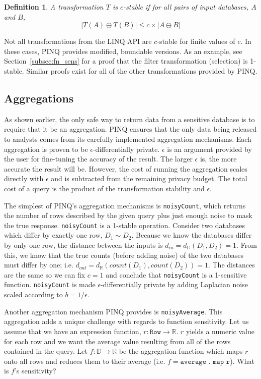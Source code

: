 \documentclass[12pt]{report}
\newtheorem{defn}{Definition}[section]
\begin{document}
\begin{defn}
A transformation $T$ is $c$-stable if for all pairs of input databases, $A$ and $B$,
$$
  |T(A)\ominus T(B)| \le c \times | A \ominus B |
$$
\end{defn}

Not all transformations from the LINQ API are $c$-stable for finite values of $c$.
In these cases, PINQ provides modified, boundable versions.
As an example, see Section~\ref{subsec:fn_sens} for a proof that the filter transformation (selection) is 1-stable.
Similar proofs exist for all of the other transformations provided by PINQ\cite{conf/sigmod/McSherry09}.

\subsection{Aggregations}

As shown earlier, the only safe way to return data from a sensitive database is to require that it be an aggregation.
PINQ ensures that the only data being released to analysts comes from its carefully implemented aggregation mechanisms.
Each aggregation is proven to be $\epsilon$-differentially private.
$\epsilon$ is an argument provided by the user for fine-tuning the accuracy of the result.
The larger $\epsilon$ is, the more accurate the result will be.
However, the cost of running the aggregation scales directly with $\epsilon$ and is subtracted from the remaining privacy budget.
The total cost of a query is the product of the transformation stability and $\epsilon$.

The simplest of PINQ's aggregation mechanisms is \texttt{noisyCount}, which returns the number of rows described by the given query plus just enough noise to mask the true response.
\texttt{noisyCount} is a 1-stable operation.
Consider two databases which differ by exactly one row, $D_1 \sim D_2$.
Because we know the databases differ by only one row, the distance between the inputs is $d_{in} = d_{\mathbb D}(D_1,D_2)=1$.
From this, we know that the true counts (before adding noise) of the two databases must differ by one; i.e. $d_{out} = d_{\mathbb R}(count(D_1),count(D_2))=1$.
The distances are the same so we can fix $c=1$ and conclude that \texttt{noisyCount} is a 1-sensitive function.
\texttt{noisyCount} is made $\epsilon$-differentially private by adding Laplacian noise scaled according to $b=1/\epsilon$.

Another aggregation mechanism PINQ provides is \texttt{noisyAverage}.
This aggregation adds a unique challenge with regards to function sensitivity.
Let us assume that we have an expression function, $r : \texttt{Row} \rightarrow \mathbb R$.
$r$ yields a numeric value for each row and we want the average value resulting from all of the rows contained in the query.
Let $f : \mathbb D \rightarrow \mathbb R$ be the aggregation function which maps $r$ onto all rows and reduces them to their average (i.e. $f = \texttt{average . map r}$).
What is $f$'s sensitivity?
\end{document}

